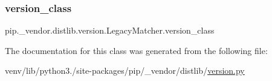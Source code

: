 \subsubsection{\texorpdfstring{version\+\_\+class}{version\_class}}
{\footnotesize\ttfamily pip.\+\_\+vendor.\+distlib.\+version.\+Legacy\+Matcher.\+version\+\_\+class\hspace{0.3cm}{\ttfamily [static]}}



The documentation for this class was generated from the following file\+:\begin{DoxyCompactItemize}
\item 
venv/lib/python3./site-\/packages/pip/\+\_\+vendor/distlib/\hyperlink{pip_2__vendor_2distlib_2version_8py}{version.\+py}\end{DoxyCompactItemize}
